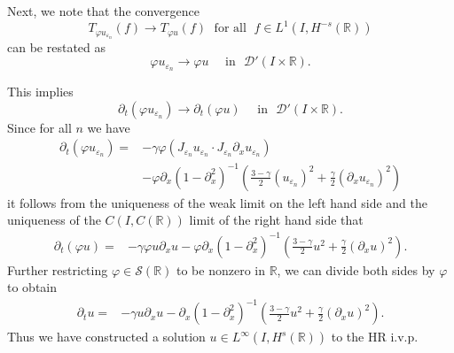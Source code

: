 \documentclass{beamer}
\newcommand{\rr}{\mathbb{R}}
\newcommand{\p}{\partial}
\newcommand{\ee}{\varepsilon}
\newcommand{\vp}{\varphi}
\begin{document}
\begin{frame}
Next, we note that the convergence  
%
\begin{equation}
\label{hhweak-conv-2}
T_{\vp u_{\ee_n}}(f)  \longrightarrow  T_{\vp u} (f) \;
\text{ for all } \;  f \in L^1(I, H^{-s}(\rr))
\end{equation}
%
can be restated as 
%
\begin{equation}
\vp u_{\ee_n}  \longrightarrow  \vp u
\quad
\text{ in }  \,\,
\mathcal{D}'(I\times \rr).
\end{equation}
%
\end{frame}
\begin{frame}
This implies 
%
\begin{equation}
\label{hhdistib-conv-2}
\p_t(\vp u_{\ee_n})  \longrightarrow  \p_t (\vp u)
\quad
\text{ in }  \,\, \mathcal{D}'(I\times \rr).
\end{equation}
%
Since for all $n$ we have 
%
\begin{equation}
\begin{split}
\p_t (\vp u_{\ee_n})
= & -\gamma \vp
(J_{\varepsilon_n} u_{\varepsilon_n}  \cdot
J_{\varepsilon_n}\partial_x u_{\varepsilon_n})
\\
& -
\vp \p_x(1- \p_x^2)^{-1} \left( \frac{3-\gamma}{2} (u_{\ee_n})^2
+ \frac{\gamma}{2} (\p_x u_{\ee_n})^2 \right )
\end{split}
\end{equation}
%
it follows from the uniqueness of the weak limit on the left hand side
and the uniqueness of the
$C(I, C(\rr))$ limit of the right hand side that 
\begin{equation}
\begin{split}
\p_t (\vp u)
= & -\gamma \vp
u \p_x u - \vp \p_x(1- \p_x^2)^{-1} \left( \frac{3-\gamma}{2} u^2
+ \frac{\gamma}{2} (\p_x u)^2 \right ).
\label{hhadone}
\end{split}
\end{equation}
Further restricting $\vp \in \mathcal{S}(\rr)$ to be nonzero in
$\rr$, we
can divide both sides by $\vp$ to obtain
\begin{equation}
\label{hh2yy}
\begin{split}
\p_t  u
= & -\gamma
u \p_x u - \p_x(1- \p_x^2)^{-1} \left( \frac{3-\gamma}{2} u^2
+ \frac{\gamma}{2} (\p_x u)^2 \right ).
\end{split}
\end{equation}
Thus we have constructed a solution $u \in L^\infty(I, H^s(\rr))$
to the HR i.v.p. 
\vskip0.1in

%
%

\end{frame}
%
%
%
%
%
\end{document}

